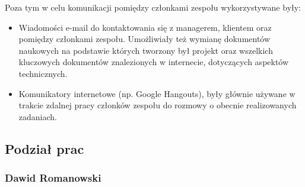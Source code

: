 \documentclass[polish, 12pt]{aghthesis}
\begin{document}
		Poza tym w celu komunikacji pomiędzy członkami zespołu wykorzystywane były:
		
		\begin{itemize}
		
			\item Wiadomości e-mail do kontaktowania się z managerem, klientem oraz pomiędzy członkami zespołu. Umożliwiały też wymianę dokumentów naukowych na podstawie których tworzony był projekt oraz wszelkich kluczowych dokumentów znalezionych w internecie, dotyczących aspektów technicznych.
			
			\item Komunikatory internetowe (np. Google Hangouts), były głównie używane w trakcie zdalnej pracy członków zespołu do rozmowy o obecnie realizowanych zadaniach.
		
		\end{itemize}
		
	\subsection{Podział prac}
	
		\subsubsection*{Dawid Romanowski} 
		
\end{document}
